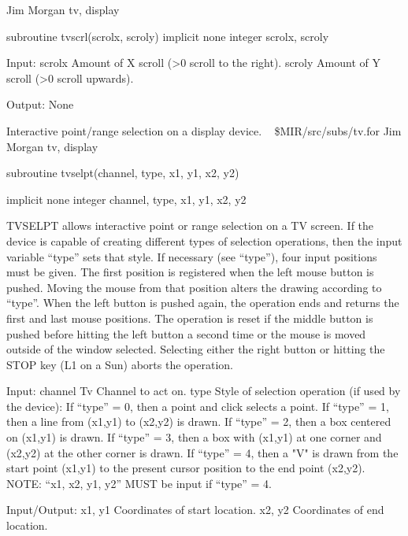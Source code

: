 \newline {} Jim Morgan
\newline {} tv, display
\par{\tenpoint
{\eightpoint\begintt
       subroutine tvscrl(scrolx, scroly)
       implicit none
       integer scrolx, scroly

  Input:
    scrolx  Amount of X scroll (>0 scroll to the right).
    scroly  Amount of Y scroll (>0 scroll upwards).

  Output:
    None
\endtt}
\par}
%
\noindent Interactive point/range selection on a display device.
\newline \ 
\newline {} \$MIR/src/subs/tv.for
\newline {} Jim Morgan
\newline {} tv, display
\par{\tenpoint
{\eightpoint\begintt
      subroutine tvselpt(channel, type, x1, y1, x2, y2)

      implicit none
      integer channel, type, x1, y1, x2, y2

  TVSELPT allows interactive point or range selection on a TV screen.
  If the device is capable of creating different types of selection
  operations, then the input variable ``type'' sets that style.  If
  necessary (see ``type''), four input positions must be given.  The
  first position is registered when the left mouse button is pushed.
  Moving the mouse from that position alters the drawing according
  to ``type''.  When the left button is pushed again, the operation
  ends and returns the first and last mouse positions.  The operation
  is reset if the middle button is pushed before hitting the left
  button a second time or the mouse is moved outside of the window
  selected.  Selecting either the right button or hitting the STOP
  key (L1 on a Sun) aborts the operation.

  Input:
    channel  Tv Channel to act on.
    type     Style of selection operation (if used by the device):
               If ``type'' = 0, then a point and click selects a point.
               If ``type'' = 1, then a line from (x1,y1) to (x2,y2)
                 is drawn.
               If ``type'' = 2, then a box centered on (x1,y1) is
                 drawn.
               If ``type'' = 3, then a box with (x1,y1) at one corner
                 and (x2,y2) at the other corner is drawn.
               If ``type'' = 4, then a "V" is drawn from the start
                 point (x1,y1) to the present cursor position to
                 the end point (x2,y2).
               NOTE:  ``x1, x2, y1, y2'' MUST be input if ``type'' = 4.

  Input/Output:
    x1, y1   Coordinates of start location.
    x2, y2   Coordinates of end location.
\endtt}
\par}
